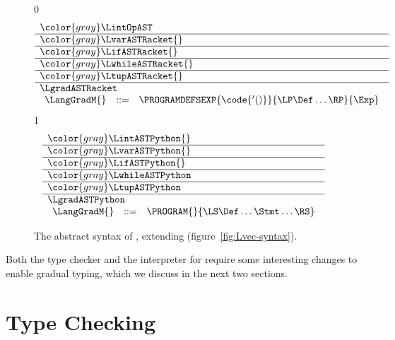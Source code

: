 \documentclass[7x10]{TimesAPriori_MIT}%
\newcommand{\gray}[1]{{\color{gray} #1}}
\def\racketEd{0}
\def\pythonEd{1}
\def\edition{0}
\numberwithin{theorem}{chapter}
\numberwithin{definition}{chapter}
\numberwithin{equation}{chapter}
\begin{document}
\begin{figure}[tp]
\centering
\begin{tcolorbox}[colback=white]
    \small
{\if\edition\racketEd
\[
\begin{array}{l}
  \gray{\LintOpAST} \\ \hline
  \gray{\LvarASTRacket{}} \\ \hline
  \gray{\LifASTRacket{}} \\ \hline
  \gray{\LwhileASTRacket{}} \\ \hline
  \gray{\LtupASTRacket{}} \\ \hline
  \LgradASTRacket \\
\begin{array}{lcl}
  \LangGradM{} &::=& \PROGRAMDEFSEXP{\code{'()}}{\LP\Def\ldots\RP}{\Exp}
\end{array}
\end{array}
\]
\fi}
{\if\edition\pythonEd
\[
\begin{array}{l}
  \gray{\LintASTPython{}} \\ \hline
  \gray{\LvarASTPython{}} \\ \hline
  \gray{\LifASTPython{}} \\ \hline
  \gray{\LwhileASTPython} \\ \hline
  \gray{\LtupASTPython} \\   \hline
  \LgradASTPython \\
  \begin{array}{lcl}
    \LangGradM{} &::=& \PROGRAM{}{\LS \Def \ldots \Stmt \ldots \RS}
  \end{array}
\end{array}
\]
\fi}
\end{tcolorbox}

\caption{The abstract syntax of \LangGrad{}, extending \LangVec{} (figure~\ref{fig:Lvec-syntax}).}
\label{fig:Lgrad-syntax}
\end{figure}

Both the type checker and the interpreter for \LangGrad{} require some
interesting changes to enable gradual typing, which we discuss in the
next two sections.



\section{Type Checking \LangGrad{}}
\label{sec:gradual-type-check}
\end{document}
